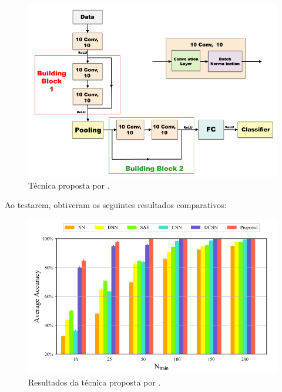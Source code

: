 \begin{figure}[H]
    \caption{Técnica proposta por .}
    \begin{center}
        \includegraphics[scale=.35]{referencial/img/proposta_zhang_p4.png}
    \end{center}
    \label{fig:proposta_zhang_p4.png}
\end{figure}

Ao testarem, obtiveram os seguintes resultados comparativos:

\begin{figure}[H]
    \caption{Resultados da técnica proposta por .}
    \begin{center}
        \includegraphics[scale=.35]{referencial/img/results_zhang_p7.png}
    \end{center}
    \label{fig:back-programation-zhang-p5}
\end{figure}

